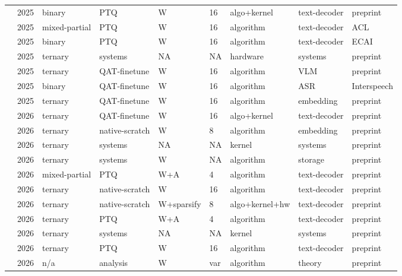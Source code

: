 \documentclass[11pt]{article}
\begin{document}
\begin{landscape}
\begin{longtable}{p{3.2cm} p{1cm} p{1.9cm} p{2.2cm} p{2.2cm} p{1.3cm} p{2.2cm} p{2.1cm} p{2.5cm}}
\citet{Anon2025-ProgBinPruning} & 2025 & binary & PTQ & W & 16 & algo+\allowbreak{}kernel & text-decoder & preprint \\
\citet{Zhao2025-PTQ161} & 2025 & mixed-partial & PTQ & W & 16 & algorithm & text-decoder & ACL \\
\citet{Xia2025-SDQLLM} & 2025 & binary & PTQ & W & 16 & algorithm & text-decoder & ECAI \\
\citet{Anon2025-TENET} & 2025 & ternary & systems & NA & NA & hardware & systems & preprint \\
\citet{Anon2025-VLMTernarization} & 2025 & ternary & QAT-finetune & W & 16 & algorithm & VLM & preprint \\
\citet{Anon2025-OneBitASR} & 2025 & binary & QAT-finetune & W & 16 & algorithm & ASR & Interspeech \\
\citet{Connor2025-UltraQuantisation} & 2025 & ternary & QAT-finetune & W & 16 & algorithm & embedding & preprint \\
\citet{Huang2026-Sherry} & 2026 & ternary & QAT-finetune & W & 16 & algo+\allowbreak{}kernel & text-decoder & preprint \\
\citet{Li2026-BitNetTextEmbeddings} & 2026 & ternary & native-scratch & W & 8 & algorithm & embedding & preprint \\
\citet{Anon2026-Litespark} & 2026 & ternary & systems & NA & NA & kernel & systems & preprint \\
\citet{Anon2026-NativeTernary} & 2026 & ternary & systems & W & NA & algorithm & storage & preprint \\
\citet{Song2026-LBLLM} & 2026 & mixed-partial & PTQ & W+\allowbreak{}A & 4 & algorithm & text-decoder & preprint \\
\citet{Nargund2026-TernaryLM} & 2026 & ternary & native-scratch & W & 16 & algorithm & text-decoder & preprint \\
\citet{Zhang2026-SparseBitNet} & 2026 & ternary & native-scratch & W+\allowbreak{}sparsify & 8 & algo+\allowbreak{}kernel+\allowbreak{}hw & text-decoder & preprint \\
\citet{Zhao2026-TWLA} & 2026 & ternary & PTQ & W+\allowbreak{}A & 4 & algorithm & text-decoder & preprint \\
\citet{Zuo2026-FairyFuse} & 2026 & ternary & systems & NA & NA & kernel & systems & preprint \\
\citet{Wang2026-CATQ} & 2026 & ternary & PTQ & W & 16 & algorithm & text-decoder & preprint \\
\citet{Anon2026-EveryBitCounts} & 2026 & n/\allowbreak{}a & analysis & W & var & algorithm & theory & preprint \\

\end{longtable}
\end{landscape}
\end{document}
